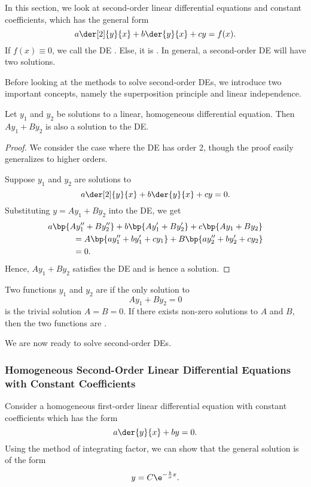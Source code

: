In this section, we look at second-order linear differential equations and constant coefficients, which has the general form \[a \der[2]{y}{x} + b \der{y}{x} + cy = f(x).\] If $f(x) \equiv 0$, we call the DE . Else, it is . In general, a second-order DE will have two solutions.

Before looking at the methods to solve second-order DEs, we introduce two important concepts, namely the superposition principle and linear independence.

\begin{theorem}
    Let $y_1$ and $y_2$ be solutions to a linear, homogeneous differential equation. Then $A y_1 + B y_2$ is also a solution to the DE.
\end{theorem}
\begin{proof}
    We consider the case where the DE has order 2, though the proof easily generalizes to higher orders.

    Suppose $y_1$ and $y_2$ are solutions to \[a \der[2]{y}{x} + b \der{y}{x} + c y = 0.\] Substituting $y = A y_1 + B y_2$ into the DE, we get
    \begin{align*}
        &a \bp{A y_1'' + By_2''} + b \bp{A y_1' + By_2'} + c\bp{Ay_1 + By_2}\\
        &\hspace{3em}= A\bp{ay_1'' + by_1' + cy_1} + B\bp{ay_2'' + by_2' + cy_2}\\
        &\hspace{3em}= 0.
    \end{align*}
    Hence, $A y_1 + By_2$ satisfies the DE and is hence a solution.
\end{proof}

\begin{definition}
    Two functions $y_1$ and $y_2$ are  if the only solution to \[A y_1 + B y_2 = 0\] is the trivial solution $A = B = 0$. If there exists non-zero solutions to $A$ and $B$, then the two functions are .
\end{definition}

We are now ready to solve second-order DEs.

\subsubsection{Homogeneous Second-Order Linear Differential Equations with Constant Coefficients}

Consider a homogeneous first-order linear differential equation with constant coefficients which has the form \[a \der{y}{x} + by = 0.\] Using the method of integrating factor, we can show that the general solution is of the form \[y = C \e^{-\frac{b}{a} x}.\]

